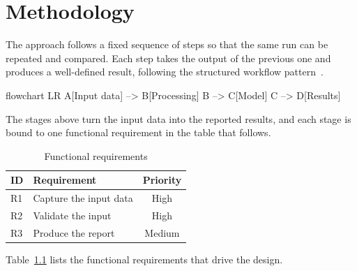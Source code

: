 \chapter{Methodology}
\label{ch:methodology}

The approach follows a fixed sequence of steps so that the same run can be
repeated and compared. Each step takes the output of the previous one and
produces a well-defined result, following the structured workflow
pattern~\cite{jones2023}.

\begin{mermaid}[style=technical, width=0.85\linewidth, pos=H, caption={System architecture}]
  flowchart LR
  A[Input data] --> B[Processing]
  B --> C[Model]
  C --> D[Results]
\end{mermaid}

The stages above turn the input data into the reported results, and each
stage is bound to one functional requirement in the table that follows.

\begin{table}[H]
  \centering
  \caption{Functional requirements}
  \label{tab:requirements}
  \begin{tabular}{@{}llc@{}}
    \toprule
    ID & Requirement & Priority \\
    \midrule
    R1 & Capture the input data & High \\
    R2 & Validate the input & High \\
    R3 & Produce the report & Medium \\
    \bottomrule
  \end{tabular}
\end{table}

Table~\ref{tab:requirements} lists the functional requirements that drive
the design.
